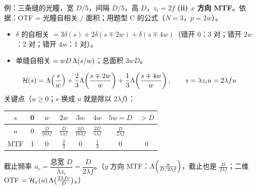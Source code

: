 \begin{exam}{例：三条缝的光瞳，宽 $D/5$，间隔 $D/5$，高 $D$，$z_i=2f$}
\textbf{(ii) $x$ 方向 MTF}。依据：OTF = 光瞳自相关 / 面积；用题型 C 的公式（$N=3$，$p=2w$）。
\begin{itemize}
\item $\delta$ 的自相关 $=3\delta(s)+2\delta(s\mp2w)+\delta(s\mp4w)$（错开 0：3 对；错开 $2w$：2 对；错开 $4w$：1 对）。
\item 单缝自相关 $=wD\,\Lambda(s/w)$；总面积 $3wD$。
\end{itemize}
\[
\mathcal H(s)=\Lambda\!\left(\frac sw\right)+\frac23\Lambda\!\left(\frac{s\mp2w}{w}\right)+\frac13\Lambda\!\left(\frac{s\mp4w}{w}\right),\qquad s=\lambda z_iu=2\lambda fu
\]
关键点（$u\ge0$；$s$ 换成 $u$ 就是除以 $2\lambda f$）：
\begin{center}
\par\renewcommand{\arraystretch}{1.3}
\begin{tabular}{c|ccccccc}
$s$ & 0 & $w$ & $2w$ & $3w$ & $4w$ & $5w=D$ & $>D$\\ \hline
$u$ & 0 & $\frac{D}{10\lambda f}$ & $\frac{D}{5\lambda f}$ & $\frac{3D}{10\lambda f}$ & $\frac{2D}{5\lambda f}$ & $\boxed{\frac{D}{2\lambda f}}$ & \\
MTF & 1 & 0 & $\frac23$ & 0 & $\frac13$ & 0 & 0
\end{tabular}
\end{center}
\begin{center}
\end{center}
截止频率 $u_c=\dfrac{\text{总宽 }D}{\lambda z_i}=\dfrac{D}{2\lambda f}$。（$y$ 方向 MTF：$\Lambda\!\left(\frac{u}{D/2\lambda f}\right)$，截止也是 $\frac{D}{2\lambda f}$；二维 OTF $=\mathcal H_x(u)\,\Lambda\big(\frac{2\lambda fv}{D}\big)$。）


\end{exam}
